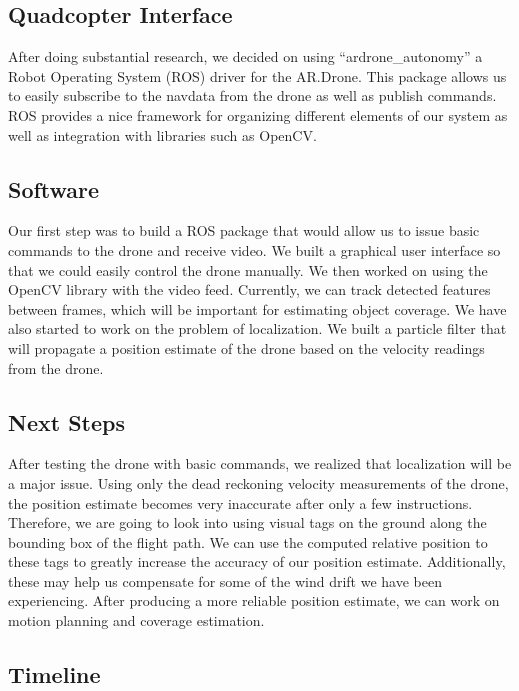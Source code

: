 \documentclass[pageno]{jpaper}
\begin{document}
\subsection{Quadcopter Interface}

After doing substantial research, we decided on using  ``ardrone\_autonomy'' a Robot Operating System (ROS) driver for the AR.Drone. This package allows us to easily subscribe to the navdata from the drone as well as publish commands. ROS provides a nice framework for organizing different elements of our system as well as integration with libraries such as OpenCV.

\subsection{Software}

Our first step was to build a ROS package that would allow us to issue basic commands to the drone and receive video. We built a graphical user interface so that we could easily control the drone manually. We then worked on using the OpenCV library with the video feed. Currently, we can track detected features between frames, which will be important for estimating object coverage. We have also started to work on the problem of localization. We built a particle filter that will propagate a position estimate of the drone based on the velocity readings from the drone.

\subsection{Next Steps}

After testing the drone with basic commands, we realized that localization will be a major issue. Using only the dead reckoning velocity measurements of the drone, the position estimate becomes very inaccurate after only a few instructions. Therefore, we are going to look into using visual tags on the ground along the bounding box of the flight path. We can use the computed relative position to these tags to greatly increase the accuracy of our position estimate. Additionally, these may help us compensate for some of the wind drift we have been experiencing. After producing a more reliable position estimate, we can work on motion planning and coverage estimation.

\subsection{Timeline}
\end{document}
